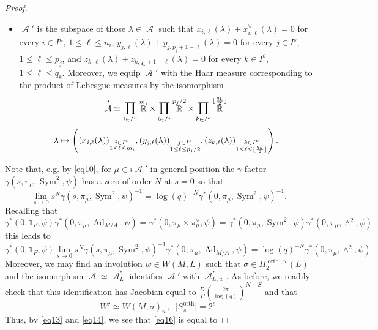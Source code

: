 \documentclass[12pt]{article}
\numberwithin{equation}{section}
\DeclareMathOperator{\orth}{orth}
\DeclareMathOperator{\Ad}{Ad}
\DeclareMathOperator{\cA}{\mathcal{A}}
\DeclareMathOperator{\bR}{\mathbb{R}}
\DeclarePairedDelimiter\floor{\lfloor}{\rfloor}
\DeclareMathOperator{\Sym}{Sym}
\begin{document}
\begin{proof}
\begin{itemize}
			\item $\cA'$ is the subspace of those $\lambda\in \cA$ such that $x_{i,\ell}(\lambda)+x_{i,\ell}^\vee(\lambda)=0$ for every $i\in I^n$, $1\leq \ell\leq n_i$, $y_{j,\ell}(\lambda)+y_{j,p_j+1-\ell}(\lambda)=0$ for every $j\in I^s$, $1\leq \ell\leq p_j$, and $z_{k,\ell}(\lambda)+z_{k,q_k+1-\ell}(\lambda)=0$ for every $k\in I^o$, $1\leq \ell\leq q_k$. Moreover, we equip $\cA'$ with the Haar measure corresponding to the product of Lebesgue measures by the isomorphism
			$$\displaystyle \cA'\simeq \prod_{i\in I^n} \bR^{m_i}\times \prod_{i\in I^s} \bR^{p_j/2}\times \prod_{k\in I^o} \bR^{\floor{\frac{q_k}{2}}}$$
			$$\displaystyle \lambda\mapsto \left((x_{i,\ell}(\lambda))_{\substack{i\in I^n \\ 1\leq \ell\leq m_i}},(y_{j,\ell}(\lambda))_{\substack{j\in I^s \\ 1\leq \ell\leq p_j/2}} , (z_{k,\ell}(\lambda))_{\substack{k\in I^o \\ 1\leq \ell\leq \floor{\frac{q_k}{2}}}}\right).$$
		\end{itemize}
		Note that, e.g. by \eqref{eq10}, for $\mu\in i\cA'$ in general position the $\gamma$-factor $\gamma(s,\pi_\mu,\Sym^2,\psi)$ has a zero of order $N$ at $s=0$ so that
		\begin{equation*}
			\displaystyle \lim\limits_{s\to 0} s^N \gamma(s,\pi_\mu,\Sym^2,\psi)^{-1}=\log(q)^{-N}\gamma^*(0,\pi_\mu,\Sym^2,\psi)^{-1}.
		\end{equation*}
		Recalling that
		$$\gamma^*(0,\mathbf{1}_F,\psi)\gamma^*(0,\pi_\mu, \Ad_{M/A},\psi)=\gamma^*(0,\pi_\mu\times \pi_\mu^\vee, \psi)=\gamma^*(0,\pi_\mu,\Sym^2,\psi)\gamma^*(0,\pi_\mu,\wedge^2,\psi)$$
		this leads to
		\begin{equation}\label{eq13}
			\displaystyle \gamma^*(0,\mathbf{1}_F,\psi)\lim\limits_{s\to 0} s^N \gamma(s,\pi_\mu,\Sym^2,\psi)^{-1}\gamma^*(0,\pi_\mu, \Ad_{M/A},\psi)=\log(q)^{-N} \gamma^*(0,\pi_\mu,\wedge^2,\psi).
		\end{equation}
		Moreover, we may find an involution $w\in W(M,L)$ such that $\sigma\in \Pi_2^{\orth,w}(L)$ and the isomorphism $\cA\simeq \cA_L^*$ identifies $\cA'$ with $\cA_{L,w}^{*}$. As before, we readily check that this identification has Jacobian equal to $\frac{D}{P}\left(\frac{2\pi}{\log(q)}\right)^{N-S}$ and that
		\begin{equation}\label{eq14}
			\displaystyle W'\simeq W(M,\sigma)_w,\;\; \lvert S_\pi^{\orth}\rvert=2^c.
		\end{equation}
		Thus, by \eqref{eq13} and \eqref{eq14}, we see that \eqref{eq16} is equal to

\end{proof}
\end{document}
